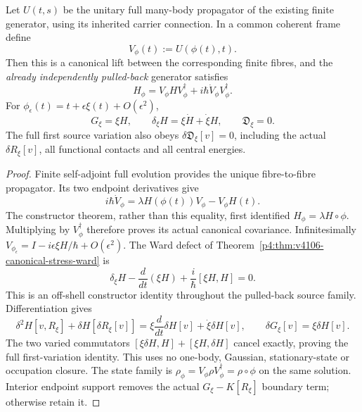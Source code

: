 \documentclass[12pt,a4paper]{article}
\begin{document}
\begin{theorem}
\label{p4:thm:v4118-homogeneous-time-ward}
Let $U(t,s)$ be the unitary full many-body propagator of the existing
finite generator, using its inherited carrier connection. In a common
coherent frame define
\[
 V_\phi(t):=U(\phi(t),t).
\]
Then this is a canonical lift between the corresponding finite fibres,
and the \emph{already independently pulled-back} generator satisfies
\[
 H_\phi=V_\phi HV_\phi^\dagger
              +i\hbar\dot V_\phi V_\phi^\dagger.
\]
For $\phi_\epsilon(t)=t+\epsilon\xi(t)+O(\epsilon^2)$,
\[
 G_\xi=\xi H,\qquad
 \delta_\xi H=\xi\dot H+\dot\xi H,
 \qquad\boxed{\mathfrak D_\xi=0.}
\]
The full first source variation also obeys
$\delta\mathfrak D_\xi[v]=0$, including the actual
$\delta R_\xi[v]$, all functional contacts and all central energies.
\end{theorem}
\begin{proof}
Finite self-adjoint full evolution provides the unique fibre-to-fibre
propagator. Its two endpoint derivatives give
\[
 i\hbar\dot V_\phi=
 \lambda H(\phi(t))V_\phi-V_\phi H(t).
\]
The constructor theorem, rather than this equality, first identified
$H_\phi=\lambda H\circ\phi$. Multiplying by $V_\phi^\dagger$
therefore proves its actual canonical covariance. Infinitesimally
$V_{\phi_\epsilon}=I-i\epsilon\xi H/\hbar+O(\epsilon^2)$.
The Ward defect of
Theorem~\ref{p4:thm:v4106-canonical-stress-ward} is
\[
 \delta_\xi H-\frac{d}{dt}(\xi H)
                +\frac{i}{\hbar}[\xi H,H]=0.
\]
This is an off-shell constructor identity throughout the pulled-back
source family. Differentiation gives
\[
 \delta^2H[v,R_\xi]+\delta H[\delta R_\xi[v]]
 =\xi\frac{d}{dt}\delta H[v]+\dot\xi\delta H[v],
 \qquad\delta G_\xi[v]=\xi\delta H[v].
\]
The two varied commutators
$[\xi\delta H,H]+[\xi H,\delta H]$ cancel exactly, proving the
full first-variation identity. This uses no one-body, Gaussian,
stationary-state or occupation closure. The state family is
$\rho_\phi=V_\phi\rho V_\phi^\dagger=\rho\circ\phi$ on the
same solution. Interior endpoint support removes the actual
$G_\xi-K[R_\xi]$ boundary term; otherwise retain it.
\end{proof}
\end{document}
